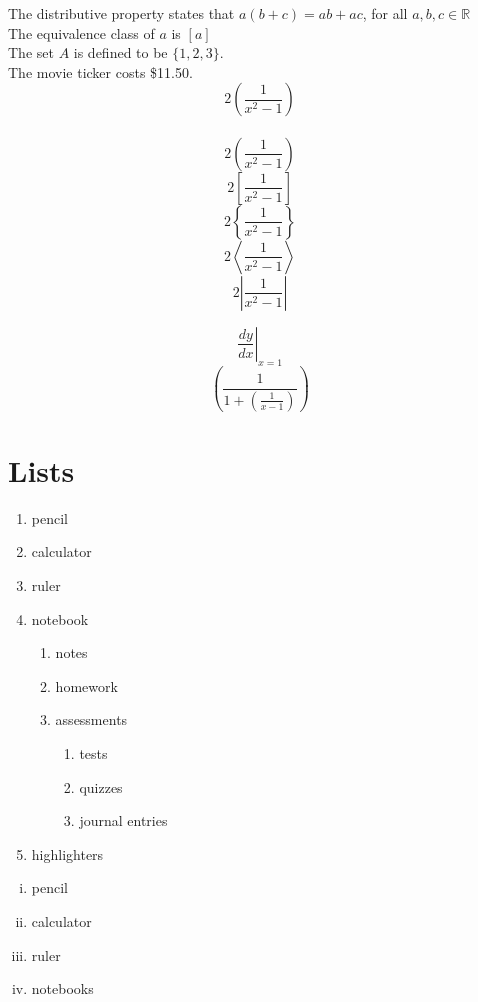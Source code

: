 \documentclass[12pt, a4paper]{article}
\begin{document}
The distributive property states that $a(b+c)
=ab+ac$, for all $a,b,c\in \mathbb{R}$\\[6pt]
The equivalence class of $a$ is $[a]$\\[6pt]
The set $A$ is defined to be $\{1,2,3\}$.\\[6pt]
The movie ticker costs \$11.50.\\[6pt]  

$$2(\frac{1}{x^2-1})$$ \\
$$2\left(\frac{1}{x^2-1}\right)$$
$$2\left[\frac{1}{x^2-1}\right]$$
$$2\left\{\frac{1}{x^2-1}\right\}$$
$$2\left\langle \frac{1}{x^2-1} \right\rangle$$
$$2\left| \frac{1}{x^2-1} \right|$$

$$\left.\frac{dy}{dx}\right|_{x=1}$$
$$\left( \frac{1}{1+\left(\frac{1}{x-1}\right)} \right)$$

\section{Lists}

\begin{enumerate}
    \item pencil
    \item calculator
    \item ruler
    \item notebook
        \begin{enumerate}
            \item notes
            \item homework
            \item assessments
            \begin{enumerate}
                \item tests
                \item quizzes
                \item journal entries
            \end{enumerate}
        \end{enumerate}
    \item highlighters
\end{enumerate}

\vspace{0.5cm}

\begin{enumerate}[i.]
    \item pencil
    \item calculator
    \item ruler
    \item notebooks
\end{enumerate}
\end{document}
